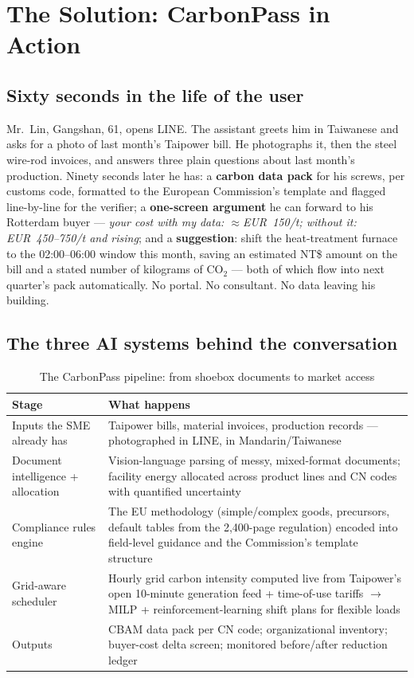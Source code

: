 \section{The Solution: CarbonPass in Action}\label{sec:solution}

\subsection{Sixty seconds in the life of the user}

Mr.~Lin, Gangshan, 61, opens LINE. The assistant greets him in Taiwanese and
asks for a photo of last month's Taipower bill. He photographs it, then the
steel wire-rod invoices, and answers three plain questions about last month's
production. Ninety seconds later he has: a \textbf{carbon data pack} for his
screws, per customs code, formatted to the European Commission's template and
flagged line-by-line for the verifier; a \textbf{one-screen argument} he can
forward to his Rotterdam buyer --- \emph{your cost with my data:
$\approx$EUR~150/t; without it: EUR~450--750/t and rising}; and a
\textbf{suggestion}: shift the heat-treatment furnace to the 02:00--06:00
window this month, saving an estimated NT\$ amount on the bill and a stated
number of kilograms of CO$_2$ --- both of which flow into next quarter's pack
automatically. No portal. No consultant. No data leaving his building.

\subsection{The three AI systems behind the conversation}

\begin{table}[htbp]
\caption{The CarbonPass pipeline: from shoebox documents to market access}
\label{tab:pipeline}
\small
\begin{tabularx}{\textwidth}{@{}p{}X@{}}
\toprule
\textbf{Stage} & \textbf{What happens} \\
\midrule
Inputs the SME already has & Taipower bills, material invoices, production records --- photographed in LINE, in Mandarin/Taiwanese \\
Document intelligence + allocation & Vision-language parsing of messy, mixed-format documents; facility energy allocated across product lines and CN codes with quantified uncertainty \\
Compliance rules engine & The EU methodology (simple/complex goods, precursors, default tables from the 2,400-page regulation\cite{omm}) encoded into field-level guidance and the Commission's template structure \\
Grid-aware scheduler & Hourly grid carbon intensity computed live from Taipower's open 10-minute generation feed\cite{taipowerdata} + time-of-use tariffs\cite{taipower} $\to$ MILP + reinforcement-learning shift plans for flexible loads \\
Outputs & CBAM data pack per CN code; organizational inventory; buyer-cost delta screen; monitored before/after reduction ledger \\
\bottomrule
\end{tabularx}
\end{table}

